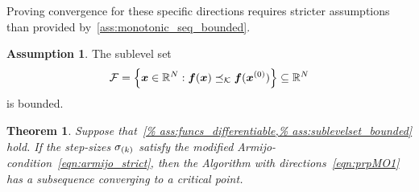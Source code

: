 \documentclass{article}
\theoremstyle{plain}
\newtheorem{theorem}{Theorem}
\theoremstyle{definition}
\newtheorem{assumption}{Assumption}
\begin{document}
Proving convergence for these specific directions
requires stricter assumptions than 
provided by~\cref{ass:monotonic_seq_bounded}.

\begin{assumption}%
	\label{ass:sublevelset_bounded}
	The sublevel set
	$$
	\mathcal F = \left\{
		\bm{x} \in \mathbb R^N: \bm{f}(\bm{x}) \preceq_\mathcal K \bm{f}(\bm{x}^{(0)})
	\right\}
	\subseteq \mathbb R^N
	$$
	is bounded.
\end{assumption}

\begin{theorem}\label{thm:prpMO1convergence}
Suppose that~\cref{%
ass:funcs_differentiable,%
ass:sublevelset_bounded}
hold.
If the step-sizes $\sigma_{(k)}$ satisfy
the modified Armijo-condition~\eqref{eqn:armijo_strict},
then the Algorithm with directions~\eqref{eqn:prpMO1}
has a subsequence converging to a critical point.
\end{theorem}
\end{document}

